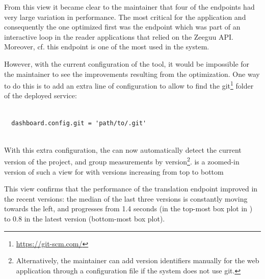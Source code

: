 \documentclass{sig-alternate-05-2015}
\begin{document}
  From this view it became clear to the maintainer that four of the endpoints had very large variation in performance.   The most critical for the application and consequently the one optimized first was the \epTranslations endpoint which was part of an interactive loop in the reader applications that relied on the Zeeguu API. Moreover, cf.  this endpoint is one of the most used in the system.


  \niceseparator


  However, with the current configuration of the tool, it would be impossible for the maintainer to see the improvements resulting from the optimization. One way to do this is to add an extra line of configuration to allow \tool to find the git\footnote{\url{https://git-scm.com/}} folder of the deployed service: 

%
%
%
    
    \begin{lstlisting}[style=custompython]
  
  dashboard.config.git = 'path/to/.git'
    
  \end{lstlisting}  
 
  With this extra configuration, the \tool can now automatically detect the current version of the project, and group measurements by version\footnote{Alternatively, the maintainer can add version identifiers manually for the web application through a configuration file if the system does not use git.}.  is a zoomed-in version of such a view for \epTranslations with versions increasing from top to bottom
  
  

  This view confirms that the performance of the translation endpoint improved in the recent versions: the median of the last three versions is constantly moving towards the left, and progresses from 1.4 seconds (in the top-most box plot in ) to 0.8 in the latest version (bottom-most box plot).
  
\end{document}
